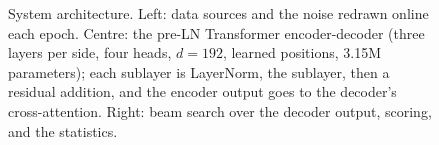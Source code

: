 \begin{figure}[t]
{%
}
\caption{System architecture. Left: data sources and the noise redrawn online each epoch. Centre: the pre-LN Transformer encoder-decoder (three layers per side, four heads, $d{=}192$, learned positions, 3.15M parameters); each sublayer is LayerNorm, the sublayer, then a residual addition, and the encoder output goes to the decoder's cross-attention. Right: beam search over the decoder output, scoring, and the statistics.}
\label{fig:architecture}
\end{figure}
